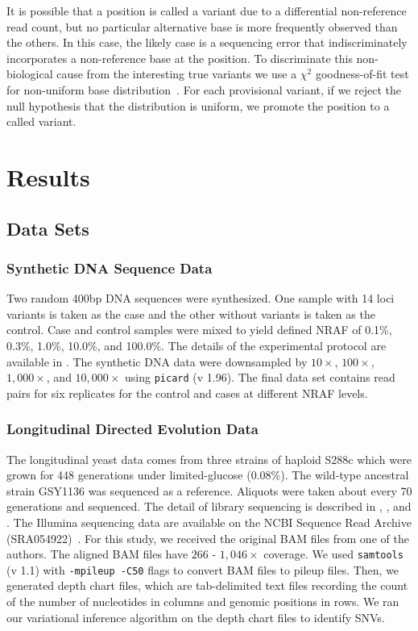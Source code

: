 \documentclass[11pt,reqno]{amsart}
\begin{document}
It is possible that a position is called a variant due to a differential non-reference read count, but no particular alternative base is more frequently observed than the others.
In this case, the likely case is a sequencing error that indiscriminately incorporates a non-reference base at the position.
To discriminate this non-biological cause from the interesting true variants we use a $\chi^2$ goodness-of-fit test for non-uniform base distribution~\citep{efron2010large, he2015rvd2}.
For each provisional variant, if we reject the null hypothesis that the distribution is uniform, we promote the position to a called variant.


\section{Results}

\subsection{Data Sets}

\subsubsection{Synthetic DNA Sequence Data}

Two random 400bp DNA sequences were synthesized. One sample with 14 loci variants is taken as the case and the other without variants is taken as the control.
Case and control samples were mixed to yield defined NRAF of 0.1\%, 0.3\%, 1.0\%, 10.0\%, and 100.0\%.
The details of the experimental protocol are available in \citet{flaherty2011ultrasensitive}.
The synthetic DNA data were downsampled by $10\times$, $100\times$, $1,000\times$, and $10,000\times$ using \texttt{picard} (v 1.96).
The final data set contains read pairs for six replicates for the control and cases at different NRAF levels.

\subsubsection{Longitudinal Directed Evolution Data}

The longitudinal yeast data comes from three strains of haploid S288c which were grown for 448 generations under limited-glucose (0.08\%).
The wild-type ancestral strain GSY1136 was sequenced as a reference.
Aliquots were taken about every 70 generations and sequenced.
The detail of library sequencing is described in \citet{kvitek2013whole}, \citet{bansal2010statistical}, and \citet{kao2008molecular}.
The Illumina sequencing data are available on the NCBI Sequence Read Archive (SRA054922)~\citep{kvitek2013whole}.
For this study, we received the original BAM files from one of the authors.
The aligned BAM files have $266$ - $1,046\times$ coverage.
We used \texttt{samtools} (v 1.1) with \texttt{-mpileup -C50} flags to convert BAM files to pileup files.
Then, we generated depth chart files, which are tab-delimited text files recording the count of the number of nucleotides in columns and genomic positions in rows.
We ran our variational inference algorithm on the depth chart files to identify SNVs.
\end{document}
